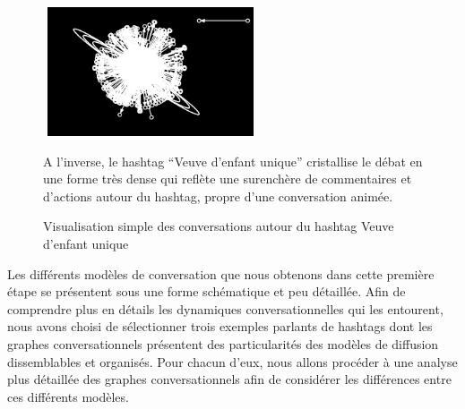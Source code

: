 \begin{figure}[ht]
    \begin{minipage}[b]{0.4\linewidth}
        \centering
        \includegraphics[width=2.5in,height=1.5in]{figures/chap3/chapitre3-img12.png}
        \par\vspace{0pt}
    \end{minipage}
    \begin{minipage}[b]{0.55\linewidth}
        \centering
        \raggedright
        A l{\textquoteright}inverse, le hashtag {\textquotedblleft}Veuve
        d{\textquoteright}enfant
        unique{\textquotedblright}  cristallise
        le débat en une forme très dense qui reflète une surenchère de
        commentaires et d{\textquoteright}actions autour du hashtag, propre
        d{\textquoteright}une conversation animée. 
        \par\vspace{0pt}
    \end{minipage}

    \caption[Visualisation simple des conversations autour du hashtag Veuve d{\textquoteright}enfant unique]{Visualisation simple des conversations autour du hashtag Veuve d{\textquoteright}enfant unique}
\end{figure}

Les différents modèles de conversation que nous obtenons dans cette première étape se présentent sous une forme schématique et peu détaillée. Afin de comprendre plus en détails les dynamiques conversationnelles qui les entourent, nous avons choisi de sélectionner trois exemples parlants de hashtags dont les graphes conversationnels présentent des particularités des modèles de diffusion dissemblables et organisés. Pour chacun d{\textquoteright}eux, nous allons procéder à une analyse plus détaillée des graphes conversationnels afin de considérer les différences entre ces différents modèles.


